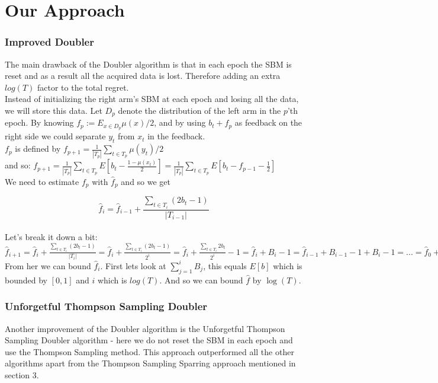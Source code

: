 \documentclass{llncs}
\begin{document}
\section{Our Approach}	
		
	\subsubsection{Improved Doubler}
	The main drawback of the Doubler algorithm is that in each epoch the SBM is reset and as a result all the acquired data is lost. Therefore adding an extra $log(T)$ factor to the total regret.\\
	Instead of initializing the right arm’s SBM at each epoch and losing all the data, we will store this data.
Let $D_p$ denote the distribution of the left arm in the $p$’th epoch. 
By knowing $f_p := E_{x\in D_p} \mu(x)/2$, and by using $b_t + f_p$ as feedback on the right side we could separate $y_t$ from $x_t$ in the feedback.
\\
		
		
		$f_p$ is defined by $f_{p+1} = 
		\frac{1}{|T_p|}\sum\limits_{t\in T_p} \mu(y_t)/2$\\
		and so: $f_{p+1} = 
		\frac{1}{|T_p|}\sum\limits_{t\in T_p} E[b_t - \frac{1-\mu(x_t)}{2}] = \frac{1}{|T_p|}\sum\limits_{t\in T_p} E[b_t - f_{p-1}-\frac{1}{2}]$ \\
		We need to estimate $f_p$ with $\hat{f}_p$ and so we get

        $$\hat{f}_i=\hat{f}_{i-1} + \frac{\sum\limits_{t\in T_i} (2b_t -1)}{|T_{i-1}|}$$
		\\		
		Let's break it down a bit:\\
		$\hat{f}_{i+1}=\hat{f}_{i} + 
		\frac{\sum\limits_{t\in T_i} (2b_t -1)}{|T_{i}|} = 
		\hat{f}_{i} + 
		\frac{\sum\limits_{t\in T_i} (2b_t -1)}{2^{i}} = 
		\hat{f}_{i} + 
		\frac{\sum\limits_{t\in T_i} 2b_t}{2^{i}}-1 = 
		\hat{f}_{i} + B_i -1 =  
		\hat{f}_{i-1} +B_{i-1} -1+ B_i -1 = ... =  
		\hat{f}_{0} + \sum\limits_{j=1}^i B_{j}+i$
		\\
		From her we can bound $\hat{f}_{i}$.
		First lets look at $\sum\limits_{j=1}^i B_{j}$, this equals $E[b]$ which is bounded by $[0,1]$ and $i$ which is $log(T)$. And so we can bound $\hat{f}$ by $\log(T)$.

				
	\subsubsection{Unforgetful Thompson Sampling Doubler}
		Another improvement of the Doubler algorithm is the Unforgetful Thompson Sampling Doubler algorithm - here we do not reset the SBM in each epoch and use the Thompson Sampling method. This approach outperformed all the other algorithms apart from the Thompson Sampling Sparring approach mentioned in section 3.
\end{document}
